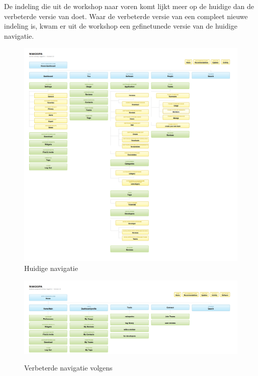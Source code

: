 De indeling die uit de workshop naar voren komt lijkt meer op de huidige dan de verbeterde versie van \citeauthor{Hoekman2008} doet. Waar de verbeterde versie van \citeauthor{Hoekman2008} een compleet nieuwe indeling is, kwam er uit de workshop een gefinetunede versie van de huidige navigatie.

      \begin{figure}
      \begin{center}
      \caption{Huidige navigatie}
        \includegraphics[width=\textwidth]{../images/currentnav}
      \end{center}
    \end{figure}

    \begin{figure}
      \begin{center}
      \caption{Verbeterde navigatie volgens \cite{Hoekman2008}}
        \includegraphics[width=\textwidth]{../images/miskeetonav}
      \label{miskeetonav}
      \end{center}
    \end{figure}


